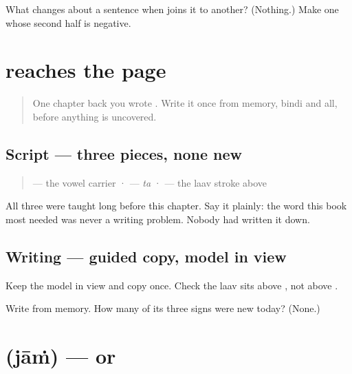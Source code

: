 \begin{tcolorbox}[breakable,colback=teal!4,colframe=teal!35!black,title={Before you move on}]
What changes about a sentence when \textbf{} joins it to another? (Nothing.) Make one whose second half is negative.
\end{tcolorbox}
\section[\texorpdfstring{\pa{ਅਤੇ} (ate)}{ਅਤੇ (ate)}]{ reaches the page}

\label{lesson:PA-C38-ate-write}



\begin{quote}
One chapter back you wrote \textbf{}. Write it once from memory, bindi and all, before anything is uncovered.
\end{quote}

\subsection*{Script — three pieces, none new}
\begin{quote}
\textbf{} — the vowel carrier · \textbf{} — \emph{ta} · \textbf{} — the laav stroke above
\end{quote}

All three were taught long before this chapter. Say it plainly: the word this book most needed was never a writing problem. Nobody had written it down.

\subsection*{Writing — guided copy, model in view}
Keep the model in view and copy \textbf{} once. Check the laav sits above \textbf{}, not above \textbf{}.

\begin{tcolorbox}[breakable,colback=teal!4,colframe=teal!35!black,title={Before you move on}]
Write \textbf{} from memory. How many of its three signs were new today? (None.)
\end{tcolorbox}
\section[\texorpdfstring{\pa{ਜਾਂ} (jāṁ)}{ਜਾਂ (jāṁ)}]{ (jāṁ) — or}

\label{lesson:PA-C38-jaan}



